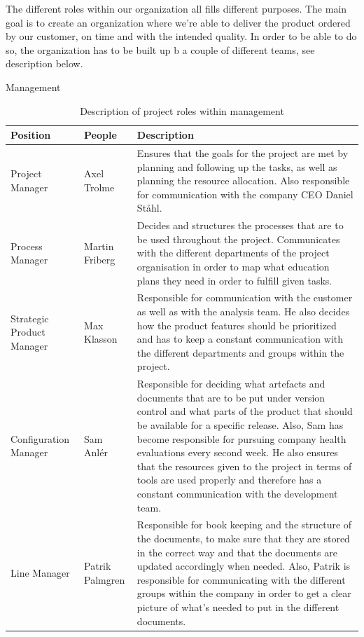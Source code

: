 The different roles within our organization all fills different purposes. The main goal is to create an organization where we're able to deliver the product ordered by our customer, on time and with the intended quality. In order to be able to do so, the organization has to be built up b a couple of different teams, see description below. 
\begin{table}[H]

\begin{center}
\begin{huge}
    Management
\end{huge}
\begin{tabular}{ | m{4cm} |m{3cm} |m{10cm}| } 
\hline
\textbf{Position} & \textbf{People} & \textbf{Description} \\ 
\hline
Project Manager & Axel Trolme & Ensures that the goals for the project are met by planning and following up the tasks, as well as planning the resource allocation. Also responsible for communication with the company CEO Daniel Ståhl. \\
\hline
Process Manager & Martin Friberg & Decides and structures the processes that are to be used throughout the project. Communicates with the different departments of the project organisation in order to map what education plans they need in order to fulfill given tasks.  \\
\hline
Strategic Product Manager & Max Klasson & Responsible for communication with the customer as well as with the analysis team. He also decides how the product features should be prioritized and has to keep a constant communication with the different departments and groups within the project.  \\
\hline
Configuration Manager & Sam Anlér & Responsible for deciding what artefacts and documents that are to be put under version control and what parts of the product that should be available for a specific release. Also, Sam has become responsible for pursuing company health evaluations every second week. He also ensures that the resources given to the project in terms of tools are used properly and therefore has a constant communication with the development team. \\
\hline
Line Manager & Patrik Palmgren & Responsible for book keeping and the structure of the documents, to make sure that they are stored in the correct way and that the documents are updated accordingly when needed. Also, Patrik is responsible for communicating with the different groups within the company in order to get a clear picture of what's needed to put in the different documents.   \\
\hline
\end{tabular}
\end{center}
\caption{\label{tab:table-name}Description of project roles within management}
\end{table}
